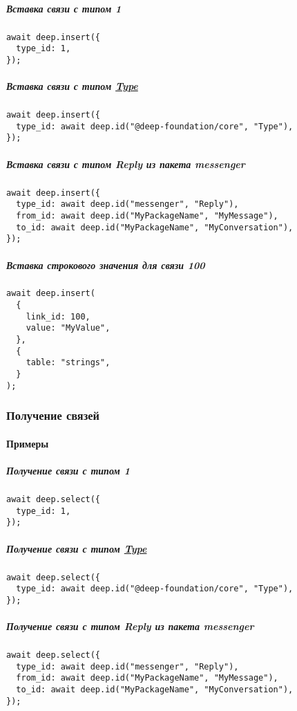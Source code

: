 \documentclass{article}
\begin{document}
\subparagraph{Вставка связи с типом 1}
\begin{lstlisting}
await deep.insert({
  type_id: 1,
});
\end{lstlisting}

\subparagraph{Вставка связи с типом \hyperlink{type.Def}{Type}}
\begin{lstlisting}
await deep.insert({
  type_id: await deep.id("@deep-foundation/core", "Type"),
});
\end{lstlisting}

\subparagraph{Вставка связи с типом Reply из пакета messenger}
\begin{lstlisting}
await deep.insert({
  type_id: await deep.id("messenger", "Reply"),
  from_id: await deep.id("MyPackageName", "MyMessage"),
  to_id: await deep.id("MyPackageName", "MyConversation"),
});
\end{lstlisting}

\subparagraph{Вставка строкового значения для связи 100}
\begin{lstlisting}
await deep.insert(
  {
    link_id: 100,
    value: "MyValue",
  },
  {
    table: "strings",
  }
);
\end{lstlisting}

\subsubsection{Получение связей}

\paragraph{Примеры}

\subparagraph{Получение связи с типом 1}
\begin{lstlisting}
await deep.select({
  type_id: 1,
});
\end{lstlisting}

\subparagraph{Получение связи с типом \hyperlink{type.Def}{Type}}
\begin{lstlisting}
await deep.select({
  type_id: await deep.id("@deep-foundation/core", "Type"),
});
\end{lstlisting}

\subparagraph{Получение связи с типом Reply из пакета messenger}
\begin{lstlisting}
await deep.select({
  type_id: await deep.id("messenger", "Reply"),
  from_id: await deep.id("MyPackageName", "MyMessage"),
  to_id: await deep.id("MyPackageName", "MyConversation"),
});
\end{lstlisting}
\end{document}
